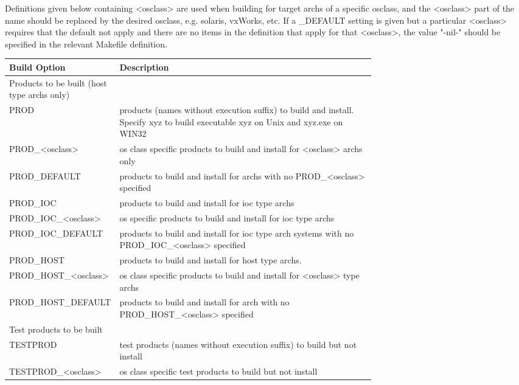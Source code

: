 Definitions given below containing \textless{}osclass\textgreater{} are used when building for target archs of a specific osclass, and the 
\textless{}osclass\textgreater{} part of the name should be replaced by the desired osclass, e.g. solaris, vxWorks, etc. If a \_DEFAULT setting is 
given but a particular \textless{}osclass\textgreater{} requires that the default not apply and there are no items in the definition that apply for 
that \textless{}osclass\textgreater{}, the value "-nil-" should be specified in the relevant Makefile definition.
\begin{center}\begin{longtable}{lp{0.7\linewidth}}
Build Option & Description\\
\hline
Products to be built (host type archs only) & \\
PROD & products (names without execution suffix) to build and install. Specify xyz to build executable xyz on Unix and xyz.exe on WIN32\\
PROD\_\textless{}osclass\textgreater{} & os class specific products to build and install for \textless{}osclass\textgreater{} archs only\\
PROD\_DEFAULT & products to build and install for archs with no PROD\_\textless{}osclass\textgreater{} specified\\
PROD\_IOC & products to build and install for ioc type archs\\
PROD\_IOC\_\textless{}osclass\textgreater{} & os specific products to build and install for ioc type archs\\
PROD\_IOC\_DEFAULT & products to build and install for ioc type arch systems with no PROD\_IOC\_\textless{}osclass\textgreater{} specified\\
PROD\_HOST & products to build and install for host type archs. \\
PROD\_HOST\_\textless{}osclass\textgreater{} & os class specific products to build and install for \textless{}osclass\textgreater{} type archs\\
PROD\_HOST\_DEFAULT & products to build and install for arch with no PROD\_HOST\_\textless{}osclass\textgreater{} specified\\
Test products to be built & \\
TESTPROD & test products (names without execution suffix) to build but not install \\
TESTPROD\_\textless{}osclass\textgreater{} & os class specific test products to build but not install\\

\end{longtable}
\end{center}
